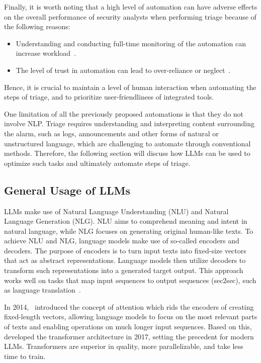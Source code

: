 Finally, it is worth noting that a high level of automation can have adverse effects on the overall performance of
security analysts when performing triage because of the following reasons:
\begin{itemize}
    \item Understanding and conducting full-time monitoring of the automation can increase
    workload\ \citep{kaber2004effects}.
    \item The level of trust in automation can lead to over-reliance or neglect\ \citep{lee2004trust}.
\end{itemize}
Hence, it is crucial to maintain a level of human interaction when automating the steps of triage, and to prioritize
user-friendliness of integrated tools.

One limitation of all the previously proposed automations is that they do not involve NLP\@.
Triage requires understanding and interpreting content surrounding the alarm, such as logs, announcements and other
forms of natural or unstructured language, which are challenging to automate through conventional methods.
Therefore, the following section will discuss how LLMs can be used to optimize such tasks and ultimately automate steps
of triage.

\subsection{General Usage of LLMs}
\label{subsec:rq1-use-of-llms}

LLMs make use of Natural Language Understanding (NLU) and Natural Language Generation (NLG).
NLU aims to comprehend meaning and intent in natural language, while NLG focuses on generating original human-like
texts.
To achieve NLU and NLG, language models make use of so-called encoders and decoders.
The purpose of encoders is to turn input texts into fixed-size vectors that act as abstract representations.
Language models then utilize decoders to transform such representations into a generated target output.
This approach works well on tasks that map input sequences to output sequences (sec2sec), such as language
translation\ \citep{sutskever2014sequence, cho2014learning}.

In 2014,\ \citet{bahdanau2014neural} introduced the concept of attention which rids the encoders of creating
fixed-length vectors, allowing language models to focus on the most relevant parts of texts and enabling operations on
much longer input sequences.
Based on this,\ \citet{vaswani2017attention} developed the transformer architecture in 2017, setting the precedent for
modern LLMs.
Transformers are superior in quality, more parallelizable, and take less time to train.

